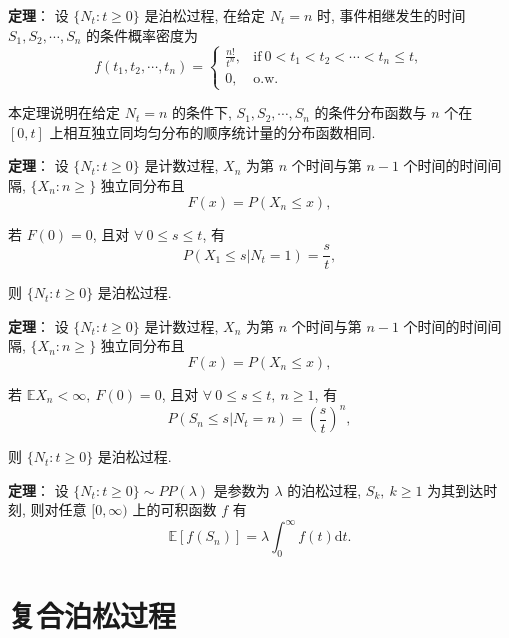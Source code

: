 \documentclass[openany]{ctexbook}
\theoremstyle{kaiti}
\theoremstyle{normal}
\begin{document}
\textbf{定理}：  
  设 $\{N_t:t\geqslant0\}$ 是泊松过程, 在给定 $N_t=n$ 时, 事件相继发生的时间 $S_1,S_2,\cdots,S_n$ 的条件概率密度为
\begin{equation}
    f(t_1,t_2,\cdots,t_n)=
    \begin{cases}
      \displaystyle \frac{n!}{t^n}, &\text{if}~0 < t_1 < t_2 < \cdots < t_n \leqslant t,\\
      0, &\text{o.w.}
    \end{cases}
\end{equation}
  
  本定理说明在给定 $N_t=n$ 的条件下, $S_1,S_2,\cdots,S_n$ 的条件分布函数与 $n$ 个在 $[0,t]$ 上相互独立同均匀分布的顺序统计量的分布函数相同.
  
\textbf{定理}：  
  设 $\{N_t:t\geqslant0\}$ 是计数过程, $X_n$ 为第 $n$ 个时间与第 $n-1$ 个时间的时间间隔, $\{X_n:n\geqslant\}$ 独立同分布且 
\begin{equation}
    F(x)=P(X_n\leqslant x),
\end{equation}
  
  若 $F(0)=0$, 且对 $\forall~0 \leqslant s \leqslant t$, 有
\begin{equation}
    P(X_1\leqslant s|N_t=1)=\frac{s}{t},
\end{equation}
  
  则 $\{N_t:t\geqslant0\}$ 是泊松过程.
  
\textbf{定理}：  
  设 $\{N_t:t\geqslant0\}$ 是计数过程, $X_n$ 为第 $n$ 个时间与第 $n-1$ 个时间的时间间隔, $\{X_n:n\geqslant\}$ 独立同分布且 
\begin{equation}
    F(x)=P(X_n\leqslant x),
\end{equation}
  
  若 $\mathbb{E}X_n < \infty,~F(0)=0$, 且对 $\forall~0 \leqslant s \leqslant t,~n\geqslant1$, 有
\begin{equation}
    P(S_n\leqslant s|N_t=n)=\left(\frac{s}{t}\right)^n,
\end{equation}
  
  则 $\{N_t:t\geqslant0\}$ 是泊松过程.
  
\textbf{定理}：  
  设 $\{N_t:t\geqslant0\}\sim PP(\lambda)$ 是参数为 $\lambda$ 的泊松过程, $S_k,~k\geqslant1$ 为其到达时刻, 则对任意 $[0,\infty)$ 上的可积函数 $f$ 有
\begin{equation}
    \mathbb{E}\left[f(S_n)\right]=\lambda\int_0^\infty f(t)\mathrm{d}t.
\end{equation}
  
\section{复合泊松过程}
  
\end{document}
